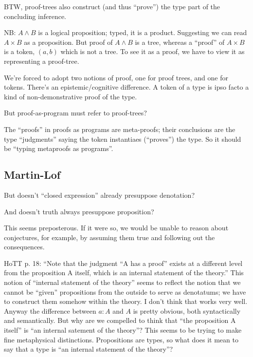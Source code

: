 \documentclass{article}
\begin{document}
BTW, proof-trees also construct (and thus ``prove'') the type part of
the concluding inference.

NB: \(A\land B\) is a logical proposition; typed, it is a product.
Suggesting we can read \(A\times B\) as a proposition. But proof of
\(A\land B\) is a tree, whereas a ``proof'' of \(A\times B\) is a
token, \((a,b)\) which is not a tree. To see it as a proof, we have to
view it as representing a proof-tree.

We're forced to adopt two notions of proof, one for proof trees, and
one for tokens. There's an epistemic/cognitive difference. A token of
a type is ipso facto a kind of non-demonstrative proof of the type.

But proof-as-program must refer to proof-trees?

The ``proofs'' in proofs as programs are meta-proofs; their
conclusions are the type ``judgments'' saying the token instantiaes
(``proves'') the type. So it should be ``typing metaproofs as
programs''.

\subsection{Martin-Lof}


But doesn't ``closed expression'' already presuppose denotation?

And doesn't truth always presuppose proposition?


This seems preposterous. If it were so, we would be unable to reason
about conjectures, for example, by assuming them true and following
out the consequences.

HoTT p. 18: \enquote{Note that the judgment “A has a proof” exists at
  a different level from the proposition A itself, which is an
  internal statement of the theory.} This notion of ``internal
statement of the theory'' seems to reflect the notion that we cannot
be ``given'' propositions from the outside to serve as denotatums; we
have to construct them somehow within the theory. I don't think that
works very well. Anyway the difference between \(a:A\) and \(A\) is
pretty obvious, both syntactically and semantically. But why are we
compelled to think that ``the proposition A itself'' is ``an internal
satement of the theory''? This seems to be trying to make fine
metaphysical distinctions. Propositions are types, so what does it
mean to say that a type is ``an internal statement of the theory''?
\end{document}
